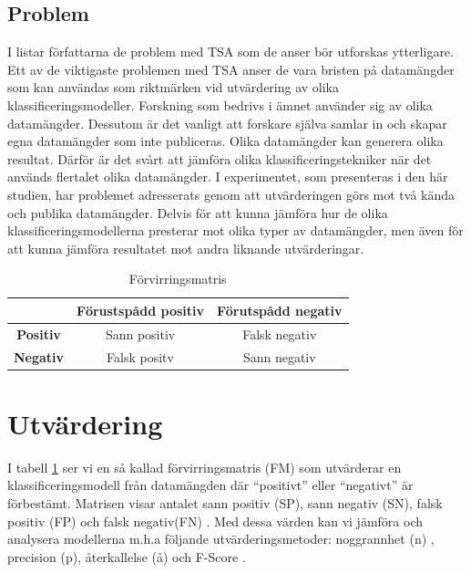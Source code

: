 \documentclass{kaumasters} %
\begin{document}
\subsection{Problem} \label{TSAprob}
I \cite{TSAsurvey} listar författarna de problem med TSA som de anser bör utforskas ytterligare. Ett av de viktigaste problemen med TSA anser de vara bristen på datamängder som kan användas som riktmärken vid utvärdering av olika klassificeringsmodeller. Forskning som bedrivs i ämnet använder sig av olika datamängder. Dessutom är det vanligt att forskare själva samlar in och skapar egna datamängder som inte publiceras. Olika datamängder kan generera olika resultat. Därför är det svårt att jämföra olika klassificeringstekniker när det används flertalet olika datamängder. I experimentet, som presenteras i den här studien, har problemet adresserats genom att utvärderingen görs mot två kända och publika datamängder. Delvis för att kunna jämföra hur de olika klassificeringsmodellerna presterar mot olika typer av datamängder, men även för att kunna jämföra resultatet mot andra liknande utvärderingar.
\begin{table}
\centering
\caption{Förvirringsmatris}
\label{tab:fm}
	\begin{tabular}{ccc}
	\toprule
	 & \textbf{Förustspådd positiv} & \textbf{Förutspådd negativ} \\
	\midrule
	\textbf{Positiv} & Sann positiv & Falsk negativ \\
	\textbf{Negativ} & Falsk positv & Sann negativ \\
	\bottomrule
\end{tabular}
\end{table}

\section{Utvärdering} \label{TSAev}
I tabell \ref{tab:fm} ser vi en så kallad förvirringsmatris (FM) som utvärderar en klassificeringsmodell från datamängden där “positivt” eller “negativt” är förbestämt. Matrisen visar antalet sann positiv (SP), sann negativ (SN), falsk positiv (FP) och falsk negativ(FN) \cite{wiki:003}. Med dessa värden kan vi jämföra och analysera modellerna m.h.a följande utvärderingsmetoder: noggrannhet (n) \cite{wiki:011}, precision (p),  återkallelse (å) \cite{wiki:002} och F-Score \cite{wiki:001}.
\end{document}
